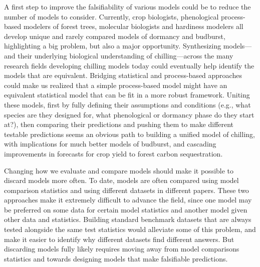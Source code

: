 \documentclass[11pt]{article}
\begin{document}
A first step to improve the falsifiability of various models could be to reduce the number of models to consider. Currently, crop biologists, phenological process-based modelers of forest trees, molecular biologists and hardiness modelers all develop unique and rarely compared models of dormancy and budburst, highlighting a big problem, but also a major opportunity. Synthesizing models---and their underlying biological understanding of chilling---across the many research fields developing chilling models today could eventually help identify the models that are equivalent. Bridging statistical and process-based approaches could make us realized that a simple process-based model might have an equivalent statistical model that can be fit in a more robust framework.  Uniting these models, first by fully defining their assumptions and conditions (e.g., what species are they designed for, what phenological or dormancy phase do they start at?), then comparing their predictions and pushing them to make different testable predictions seems an obvious path to building a unified model of chilling, with implications for much better models of budburst, and cascading improvements in forecasts for crop yield to forest carbon sequestration. 

Changing how we evaluate and compare models should make it possible to discard models more often.  To date, models are often compared using model comparison statistics and using different datasets in different papers. These two approaches make it extremely difficult to advance the field, since one model may be preferred on some data for certain model statistics and another model given other data and statistics. Building standard benchmark datasets that are always tested alongside the same test statistics would alleviate some of this problem, and make it easier to identify why different datasets find different answers. But discarding models fully likely requires moving away from model comparisons statistics and towards designing models that make falsifiable predictions.
\end{document}
